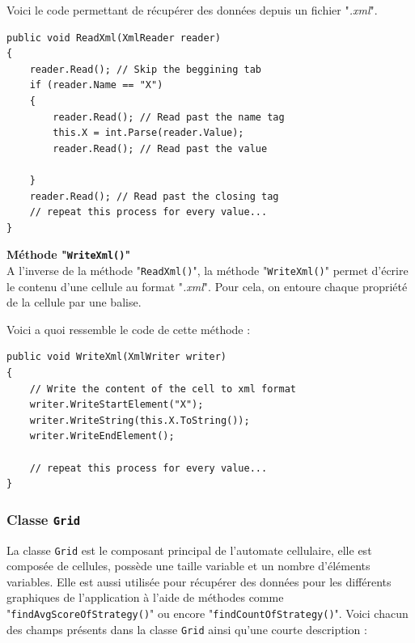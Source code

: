 \documentclass[a4paper]{article}
\begin{document}
Voici le code permettant de récupérer des données depuis un fichier "\textit{.xml}".

\begin{lstlisting}
public void ReadXml(XmlReader reader)
{
    reader.Read(); // Skip the beggining tab
    if (reader.Name == "X")
    {
        reader.Read(); // Read past the name tag
        this.X = int.Parse(reader.Value);
        reader.Read(); // Read past the value 

    }
    reader.Read(); // Read past the closing tag
    // repeat this process for every value...
}
\end{lstlisting}


\textbf{Méthode "\texttt{WriteXml()}"}\\
A l'inverse de la méthode "\texttt{ReadXml()}", la méthode "\texttt{WriteXml()}" permet d'écrire le contenu d'une cellule au format "\textit{.xml}". Pour cela, on entoure chaque propriété de la cellule par une balise.

Voici a quoi ressemble le code de cette méthode :

\begin{lstlisting}
public void WriteXml(XmlWriter writer)
{
    // Write the content of the cell to xml format
    writer.WriteStartElement("X");
    writer.WriteString(this.X.ToString());
    writer.WriteEndElement();
    
    // repeat this process for every value...
}
\end{lstlisting}

\pagebreak
\subsubsection{Classe \texttt{Grid}}
La classe \texttt{Grid} est le composant principal de l'automate cellulaire, elle est composée de cellules, possède une taille variable et un nombre d'éléments variables. Elle est aussi utilisée pour récupérer des données pour les différents graphiques de l'application à l'aide de méthodes comme "\texttt{findAvgScoreOfStrategy()}" ou encore "\texttt{findCountOfStrategy()}". Voici chacun des champs présents dans la classe \texttt{Grid} ainsi qu'une courte description : 
\end{document}

